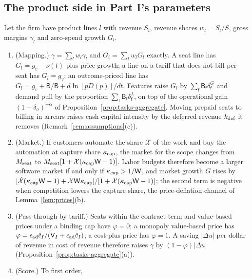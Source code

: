 \subsection{The product side in Part I's parameters}\label{sec:product-aggregate}

Let the firm have product lines $l$ with revenue $S_l$, revenue shares $w_l=S_l/S$, gross margins $\gamma_l$ and zero-spend growth $G_l$.

\begin{proposition}\label{prop:prod-aggregate}
\begin{enumerate}
\item[(a)] (Mapping.) $\gamma=\sum_lw_l\gamma_l$ and $G_i=\sum_lw_lG_l$ exactly. A seat line has $G_l=g_v-\nu(t)$ plus price growth; a line on a tariff that does not bill per seat has $G_l=g_v$; an outcome-priced line has $G_l=g_v+\dot{\mathsf B}/\mathsf B+d\ln[pD(p)]/dt$. Features raise $G_l$ by $\sum_{\mathsf f}\mathsf B_{\mathsf f}\delta^G_{\mathsf f}$ and demand pull by the proportion $\sum_{\mathsf f}\mathsf B_{\mathsf f}\delta^\lambda_{\mathsf f}$, on top of the operational gain $(1-\delta_\sigma)^{-\alpha}$ of Proposition~\ref{prop:tasks-aggregate}. Moving prepaid seats to billing in arrears raises cash capital intensity by the deferred revenue $k_{\rm def}$ it removes (Remark~\ref{rem:assumptions}(c)).
\item[(b)] (Market.) If customers automate the share $\mathcal X$ of the work and buy the automation at capture share $\kappa_{\rm cap}$, the market for the scope changes from $M_{\rm seat}$ to $M_{\rm seat}[1+\mathcal X(\kappa_{\rm cap}\mathsf W-1)]$. Labor budgets therefore become a larger software market if and only if $\kappa_{\rm cap}>1/\mathsf W$, and market growth $G$ rises by $[\dot{\mathcal X}(\kappa_{\rm cap}\mathsf W-1)+\mathcal X\mathsf W\dot\kappa_{\rm cap}]/[1+\mathcal X(\kappa_{\rm cap}\mathsf W-1)]$; the second term is negative when competition lowers the capture share, the price-deflation channel of Lemma~\ref{lem:prices}(b).
\item[(c)] (Pass-through by tariff.) Seats within the contract term and value-based prices under a binding cap have $\varphi=0$; a monopoly value-based price has $\varphi=\epsilon_{\rm ad}\hat c_I/(\mathsf V_I+\epsilon_{\rm ad}\hat c_I)$; a cost-plus price has $\varphi=1$. A saving $|\Delta u|$ per dollar of revenue in cost of revenue therefore raises $\gamma$ by $(1-\varphi)|\Delta u|$ (Proposition~\ref{prop:tasks-aggregate}(a)).
\item[(d)] (Score.) To first order,

\end{enumerate}
\end{proposition}
